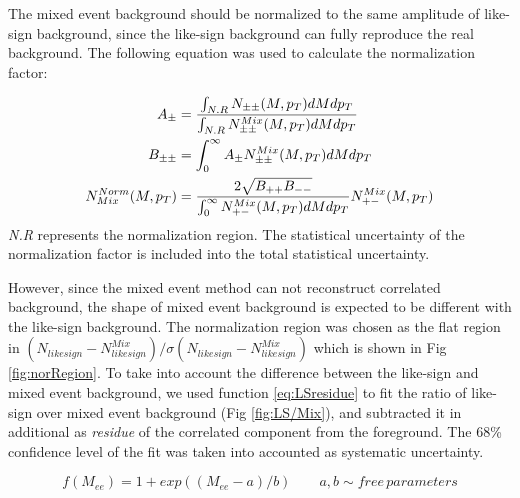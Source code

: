 The mixed event background should be normalized to the same amplitude
of like-sign background, since the like-sign background can fully
reproduce the real background. The following equation was used to
calculate the normalization factor:

\begin{align}
A_{\pm} & =\frac{\intop_{N.R}N_{\pm\pm}(M,p_{T})dMdp_{T}}{\int_{N.R}N_{\pm\pm}^{Mix}(M,p_{T})dMdp_{T}}\nonumber \\
B_{\pm\pm} & =\int_{0}^{\infty}A_{\pm}N_{\pm\pm}^{Mix}(M,p_{T})dMdp_{T}\\
N_{Mix}^{Norm}(M,p_{T}) & =\frac{2\sqrt{B_{++}B_{--}}}{\int_{0}^{\infty}N_{+-}^{Mix}(M,p_{T})dMdp_{T}}N_{+-}^{Mix}(M,p_{T})\nonumber 
\end{align}
\emph{N.R }represents the normalization region. The statistical uncertainty
of the normalization factor is included into the total statistical
uncertainty.

However, since the mixed event method can not reconstruct correlated
background, the shape of mixed event background is expected to be
different with the like-sign background. The normalization region
was chosen as the flat region in $(N_{likesign}-N_{likesign}^{Mix})/\sigma(N_{likesign}-N_{likesign}^{Mix})$
which is shown in Fig \ref{fig:norRegion}. To take into account the
difference between the like-sign and mixed event background, we used
function \ref{eq:LSresidue} to fit the ratio of like-sign over mixed
event background (Fig \ref{fig:LS/Mix}), and subtracted it in additional
as \emph{residue }of the correlated component from the foreground.
The 68\% confidence level of the fit was taken into accounted as systematic
uncertainty.

\begin{equation}
f(M_{ee})=1+exp((M_{ee}-a)/b)\qquad a,b\sim free\, parameters\label{eq:LSresidue}
\end{equation}


